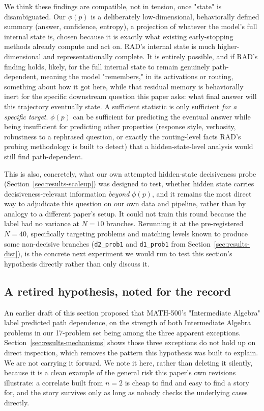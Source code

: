 \documentclass{article}
\begin{document}
We think these findings are compatible, not in tension, once "state" is disambiguated. Our $\phi(p)$ is a deliberately low-dimensional, behaviorally defined summary (answer, confidence, entropy), a projection of whatever the model's full internal state is, chosen because it is exactly what existing early-stopping methods already compute and act on. RAD's internal state is much higher-dimensional and representationally complete. It is entirely possible, and if RAD's finding holds, likely, for the full internal state to remain genuinely path-dependent, meaning the model "remembers," in its activations or routing, something about how it got here, while that residual memory is behaviorally inert for the specific downstream question this paper asks: what final answer will this trajectory eventually state. A sufficient statistic is only sufficient \emph{for a specific target}. $\phi(p)$ can be sufficient for predicting the eventual answer while being insufficient for predicting other properties (response style, verbosity, robustness to a rephrased question, or exactly the routing-level facts RAD's probing methodology is built to detect) that a hidden-state-level analysis would still find path-dependent.

This is also, concretely, what our own attempted hidden-state decisiveness probe (Section~\ref{sec:results-scaleup}) was designed to test, whether hidden state carries decisiveness-relevant information \emph{beyond} $\phi(p)$, and it remains the most direct way to adjudicate this question on our own data and pipeline, rather than by analogy to a different paper's setup. It could not train this round because the label had no variance at $N=10$ branches. Rerunning it at the pre-registered $N=40$, specifically targeting problems and matching levels known to produce some non-decisive branches (\texttt{d2\_prob1} and \texttt{d1\_prob1} from Section~\ref{sec:results-dist}), is the concrete next experiment we would run to test this section's hypothesis directly rather than only discuss it.

\subsection{A retired hypothesis, noted for the record}
\label{sec:discussion-subject}

An earlier draft of this section proposed that MATH-500's "Intermediate Algebra" label predicted path dependence, on the strength of both Intermediate Algebra problems in our 17-problem set being among the three apparent exceptions. Section~\ref{sec:results-mechanisms} shows those three exceptions do not hold up on direct inspection, which removes the pattern this hypothesis was built to explain. We are not carrying it forward. We note it here, rather than deleting it silently, because it is a clean example of the general risk this paper's own revisions illustrate: a correlate built from $n=2$ is cheap to find and easy to find a story for, and the story survives only as long as nobody checks the underlying cases directly.
\end{document}
